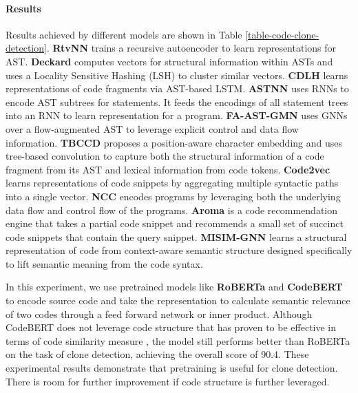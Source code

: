 \documentclass[sigconf,nonacm,screen]{acmart}
\begin{document}
\paragraph{Results}
Results achieved by different models are shown in Table \ref{table-code-clone-detection}. 
\textbf{RtvNN} \citep{white2016deep} trains a recursive autoencoder to learn representations for AST. 
\textbf{Deckard}  \citep{jiang2007deckard} computes vectors for structural information within ASTs and uses a Locality Sensitive Hashing (LSH) \citep{datar2004locality} to cluster similar vectors.
\textbf{CDLH} \citep{wei2017supervised} learns representations of code fragments via AST-based LSTM. 
\textbf{ASTNN} \cite{zhang2019novel} uses RNNs to encode AST subtrees for statements. It feeds the encodings of all statement trees into an RNN to learn representation for a program.
\textbf{FA-AST-GMN} \citep{wang2020detecting} uses GNNs over a flow-augmented AST to leverage explicit control and data flow information. 
\textbf{TBCCD} \citep{yu2019neural} proposes a position-aware character embedding and uses tree-based convolution to capture both the structural information of a code fragment from its AST and lexical information from code tokens.
\textbf{Code2vec} \cite{alon2019code2vec} learns representations of code snippets by aggregating multiple syntactic paths into a single vector. 
\textbf{NCC} \cite{ben2018neural} encodes programs by leveraging both the underlying data flow and control flow of the programs.
\textbf{Aroma} \cite{luan2019aroma} is a code recommendation engine that takes a partial code snippet and recommends a small set of succinct code snippets that contain the query snippet.
\textbf{MISIM-GNN} \cite{ye2020misim} learns a structural representation of code from context-aware semantic structure designed specifically to lift semantic meaning from the code syntax.

In this experiment, we use pretrained models like \textbf{RoBERTa} \cite{liu2019roberta} and \textbf{CodeBERT} \cite{feng2020codebert} to encode source code and take the representation to calculate semantic relevance of two codes through a feed forward
network or inner product.  Although CodeBERT does not leverage code structure that has proven to be effective in terms of code similarity measure  \cite{wei2017supervised,zhang2019novel,wang2020detecting,ben2018neural, ye2020misim}, the model still performs better than RoBERTa on the task of clone detection, achieving the overall score of 90.4. These experimental results demonstrate that pretraining is useful for clone detection.  
There is room for further improvement if code structure is further leveraged.
\end{document}
